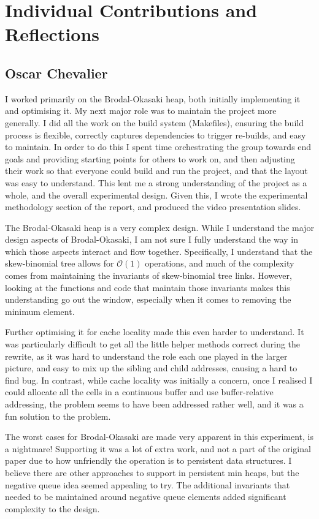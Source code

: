 \section{Individual Contributions and Reflections}
\subsection{Oscar Chevalier}

I worked primarily on the Brodal-Okasaki heap, both initially implementing it
and optimising it. My next major role was to maintain the project more
generally. I did all the work on the build system (Makefiles), ensuring the
build process is flexible, correctly captures dependencies to trigger re-builds,
and easy to maintain. In order to do this I spent time orchestrating the group
towards end goals and providing starting points for others to work on, and then
adjusting their work so that everyone could build and run the project, and that
the layout was easy to understand. This lent me a strong understanding of the
project as a whole, and the overall experimental design. Given this, I wrote the
experimental methodology section of the report, and produced the video
presentation slides.

The Brodal-Okasaki heap is a very complex design. While I understand the major
design aspects of Brodal-Okasaki, I am not sure I fully understand the way in
which those aspects interact and flow together. Specifically, I understand that
the skew-binomial tree allows for $\mathcal{O}(1)$  operations,
and much of the complexity comes from maintaining the invariants of
skew-binomial tree links. However, looking at the functions and code that
maintain those invariants makes this understanding go out the window, especially
when it comes to removing the minimum element.

Further optimising it for cache locality made this even harder to understand.
It was particularly difficult to get all the little helper methods correct
during the rewrite, as it was hard to understand the role each one played in the
larger picture, and easy to mix up the sibling and child addresses, causing a
hard to find bug. In contrast, while cache locality was initially a concern,
once I realised I could allocate all the cells in a continuous buffer and use
buffer-relative addressing, the problem seems to have been addressed rather
well, and it was a fun solution to the problem.

The worst cases for Brodal-Okasaki are made very apparent in this experiment,
 is a nightmare! Supporting it was a lot of extra work, and
not a part of the original paper due to how unfriendly the operation is to
persistent data structures. I believe there are other approaches to support
 in persistent min heaps, but the negative queue idea seemed
appealing to try. The additional invariants that needed to be maintained around
negative queue elements added significant complexity to the design.

